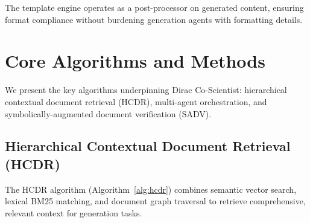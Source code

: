 \documentclass{ieeeaccess}
\begin{document}
The template engine operates as a post-processor on generated content, ensuring format compliance without burdening generation agents with formatting details.

\section{Core Algorithms and Methods}\label{sec:methods}

We present the key algorithms underpinning Dirac Co-Scientist: hierarchical contextual document retrieval (HCDR), multi-agent orchestration, and symbolically-augmented document verification (SADV).

\subsection{Hierarchical Contextual Document Retrieval (HCDR)}

The HCDR algorithm (Algorithm~\ref{alg:hcdr}) combines semantic vector search, lexical BM25 matching, and document graph traversal to retrieve comprehensive, relevant context for generation tasks.
\end{document}

